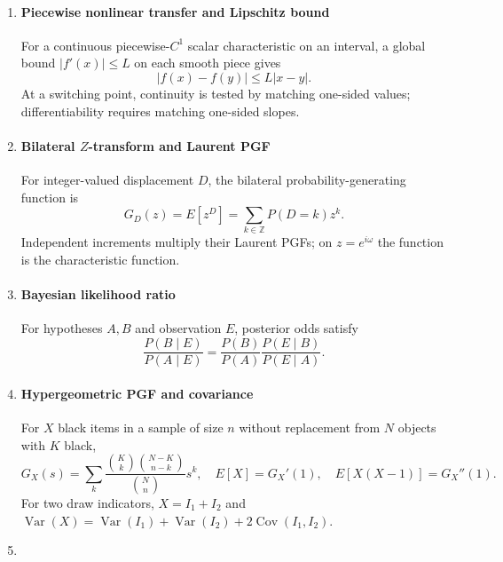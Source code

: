 \begin{enumerate}[leftmargin=0pt,itemsep=6pt]
\[\paragraph*{Abelian group axioms}
A group operation is closed and associative, has an identity $e$, and gives every element an inverse. Commutativity adds $a*b=b*a$; a commutative group is Abelian.
\label{eq:componentwise-operation-50}
\item
\paragraph*{Cyclic group over $\mathbb Z_7$}
Addition modulo 7 is
\[
a*b=(a+b)\bmod7,\quad e=0,\quad a^{-1}=(-a)\bmod7.
\]
Since 7 is prime, every nonzero residue is a generator of the cyclic additive group.
\label{eq:modular-operation-51}
\item
\paragraph*{Piecewise nonlinear transfer and Lipschitz bound}
For a continuous piecewise-$C^1$ scalar characteristic on an interval, a global bound $|f'(x)|\le L$ on each smooth piece gives
\[
|f(x)-f(y)|\le L|x-y|.
\]
At a switching point, continuity is tested by matching one-sided values; differentiability requires matching one-sided slopes.
\label{eq:continuity-limits-52}
\item
\paragraph*{Bilateral $Z$-transform and Laurent PGF}
For integer-valued displacement $D$, the bilateral probability-generating function is
\[
G_D(z)=E[z^D]=\sum_{k\in\mathbb Z}P(D=k)z^k.
\]
Independent increments multiply their Laurent PGFs; on $z=e^{i\omega}$ the function is the characteristic function.
\label{eq:walk-pgf}
\item
\paragraph*{Bayesian likelihood ratio}
For hypotheses $A,B$ and observation $E$, posterior odds satisfy
\[
\frac{P(B\mid E)}{P(A\mid E)}
=\frac{P(B)}{P(A)}
\frac{P(E\mid B)}{P(E\mid A)}.
\]
\label{eq:bayes-54}
\item
\paragraph*{Hypergeometric PGF and covariance}
For $X$ black items in a sample of size $n$ without replacement from $N$ objects with $K$ black,
\[
G_X(s)=\sum_k\frac{\binom Kk\binom{N-K}{n-k}}{\binom Nn}s^k,
\quad E[X]=G_X'(1),\quad
E[X(X-1)]=G_X''(1).
\]
For two draw indicators, $X=I_1+I_2$ and
$\operatorname{Var}(X)=\operatorname{Var}(I_1)+\operatorname{Var}(I_2)+2\operatorname{Cov}(I_1,I_2)$.
\label{eq:hypergeometric-55}
\item
\]
\end{enumerate}
